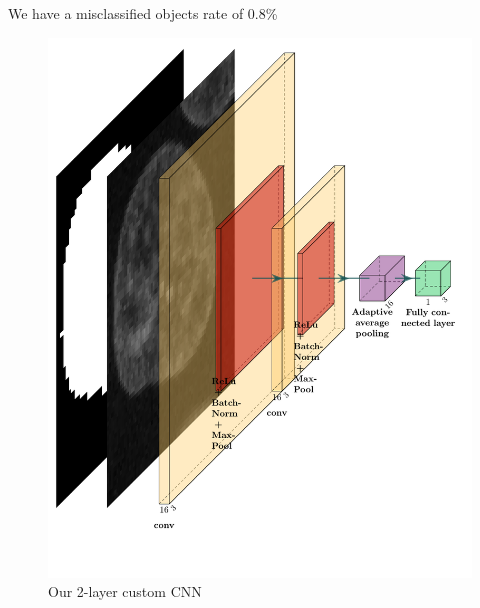 \documentclass{article}
\begin{document}
We have a misclassified objects rate of 0.8\%


\begin{figure}[h!]{}
 \centering
 \includegraphics[scale=0.35]{Figures/myfirstcnn.pdf}
  \caption{Our 2-layer custom CNN}
  \label{CNN2D}

\end{figure}
\end{document}
